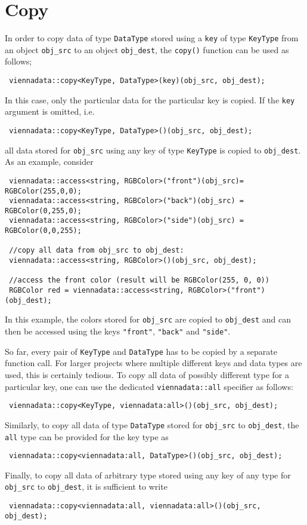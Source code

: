 \section{Copy} \label{sec:copy}
In order to copy data of type \lstinline|DataType| stored using a \lstinline|key| of type \lstinline|KeyType| from an object \lstinline|obj_src| to an object \lstinline|obj_dest|,
the \lstinline|copy()| function can be used as follows;
\begin{lstlisting}
 viennadata::copy<KeyType, DataType>(key)(obj_src, obj_dest);
\end{lstlisting}
In this case, only the particular data for the particular key is copied. If the \lstinline|key| argument is omitted, i.e.
\begin{lstlisting}
 viennadata::copy<KeyType, DataType>()(obj_src, obj_dest);
\end{lstlisting}
all data stored for \lstinline|obj_src| using any key of type \lstinline|KeyType| is copied to \lstinline|obj_dest|.
As an example, consider
\begin{lstlisting}
 viennadata::access<string, RGBColor>("front")(obj_src)= RGBColor(255,0,0);
 viennadata::access<string, RGBColor>("back")(obj_src) = RGBColor(0,255,0);
 viennadata::access<string, RGBColor>("side")(obj_src) = RGBColor(0,0,255);

 //copy all data from obj_src to obj_dest:
 viennadata::access<string, RGBColor>()(obj_src, obj_dest);

 //access the front color (result will be RGBColor(255, 0, 0))
 RGBColor red = viennadata::access<string, RGBColor>("front")(obj_dest);
\end{lstlisting}
In this example, the colors stored for \lstinline|obj_src| are copied to \lstinline|obj_dest| and can then be accessed using the keys \lstinline|"front"|, \lstinline|"back"| and \lstinline|"side"|.


So far, every pair of \lstinline|KeyType| and \lstinline|DataType| has to be copied by a separate function call.
For larger projects where multiple different keys and data types are used, this is certainly tedious. To copy all
data of possibly different type for a particular key, one can use the dedicated \lstinline|viennadata::all| specifier as follows:
\begin{lstlisting}
 viennadata::copy<KeyType, viennadata:all>()(obj_src, obj_dest);
\end{lstlisting}
Similarly, to copy all data of type \lstinline|DataType| stored for \lstinline|obj_src| to \lstinline|obj_dest|, the \lstinline|all| type can be provided for the key type as
\begin{lstlisting}
 viennadata::copy<viennadata:all, DataType>()(obj_src, obj_dest);
\end{lstlisting}
Finally, to copy all data of arbitrary type stored using any key of any type for \lstinline|obj_src| to \lstinline|obj_dest|,
it is sufficient to write
\begin{lstlisting}
 viennadata::copy<viennadata:all, viennadata:all>()(obj_src, obj_dest);
\end{lstlisting}

